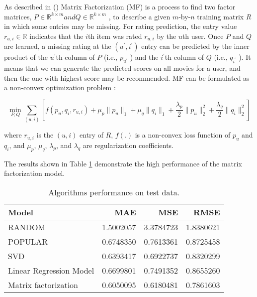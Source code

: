 \documentclass[
]{article}
\begin{document}
As described in () Matrix Factorization (MF) is a process to find two factor matrices, \(P\in \mathbb{R}^{k\times m} and Q \in \mathbb{R}^{k\times m}\) , to describe a given \(m\)-by-\(n\) training matrix \(R\) in which some entries may be missing.
For rating prediction, the entry value \(r_{u,i}\in \mathbb{R}\) indicates that the \(i\)th item was rated \(r_{u,i}\) by the \(u\)th user. Once \(P\) and \(Q\) are learned, a missing rating at the \((u^{\prime}, i^{\prime})\) entry can be predicted by the inner product of the \(u^{\prime}\)th column of \(P\) (i.e., \(p_{u^{\prime}}\) ) and the \(i^{\prime}\)th column of \(Q\) (i.e., \(q_{i^{\prime}}\) ). It means that we can generate the predicted scores on all movies for a user, and then the one with highest score may be recommended. MF can be formulated as a non-convex optimization problem :

\begin{equation}
    \min_{P,Q} \sum_{(u,i)}\left[ f(p_{u},q_{i},r_{u,i}) + \mu_{p}\|p_{u}\|_{1} + \mu_{q}\|q_{i}\|_{1} + \frac{\lambda_{p}}{2}\|p_{u}\|_{2}^{2} + \frac{\lambda_{q}}{2}\|q_{i}\|_{2}^{2}\right] 
    \label{eq:modelC}
\end{equation}

where \(r_{u,i}\) is the \((u, i)\) entry of \(R\), \(f (.)\) is a non-convex loss function of \(p_{u}\) and \(q_{i}\), and \(\mu_{p}\),
\(\mu_{q}\), \(\lambda_{p}\), and \(\lambda_{q}\) are regularization coefficients.

The results shown in Table \ref{tab:modelC2} demonstrate the high performance of the matrix factorization model.

\begin{table}[H]
\centering
\caption{\label{tab:modelC2}Algorithms performance on test data.}
\centering
\begin{tabular}[t]{lrrr}
\toprule
Model & MAE & MSE & RMSE\\
\midrule
RANDOM & 1.5002057 & 3.3784723 & 1.8380621\\
POPULAR & 0.6748350 & 0.7613361 & 0.8725458\\
SVD & 0.6393417 & 0.6922737 & 0.8320299\\
Linear Regression Model & 0.6699801 & 0.7491352 & 0.8655260\\
Matrix factorization & 0.6050095 & 0.6180481 & 0.7861603\\
\bottomrule
\end{tabular}
\end{table}
\end{document}
